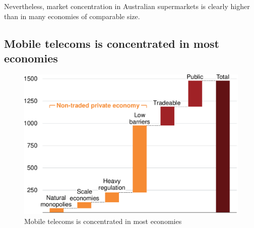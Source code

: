 Nevertheless, market concentration in Australian supermarkets is clearly higher than in many economies of comparable size. %


\clearpage

\subsection{Mobile telecoms is concentrated in most economies}

\begin{figure}
    \caption{Mobile telecoms is concentrated in most economies\label{fig:mobile}}
    \includegraphics[page=10]{atlas/Charts} \vspace{-40pt} 
\end{figure}

